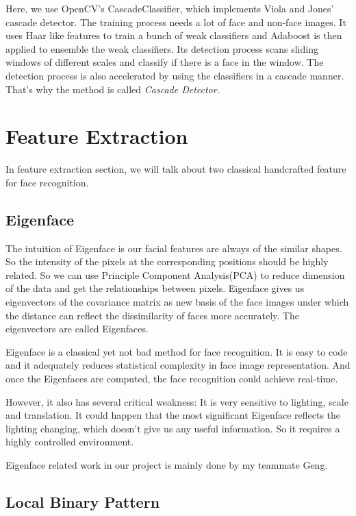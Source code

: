 \documentclass[paper=a4, fontsize=11pt]{scrartcl} %
\numberwithin{equation}{section} %
\numberwithin{figure}{section} %
\numberwithin{table}{section} %
\begin{document}
Here, we use OpenCV's CascadeClassifier, which implements Viola and Jones' cascade detector\cite{viola2001rapid}. The training process needs a lot of face and non-face images. It uses Haar like features to train a bunch of weak classifiers and Adaboost is then applied to ensemble the weak classifiers. Its detection process scans sliding windows of different scales and classify if there is a face in the window. The detection process is also accelerated by using the classifiers in a cascade manner. That's why the method is called \textit{Cascade Detector}.

\section{Feature Extraction}
In feature extraction section, we will talk about two classical handcrafted feature for face recognition.
\subsection{Eigenface}
The intuition of Eigenface\cite{turk1991face} is our facial features are always of the similar shapes. So the intensity of the pixels at the corresponding positions should be highly related. So we can use Principle Component Analysis(PCA) to reduce dimension of the data and get the relationships between pixels. Eigenface gives us eigenvectors of the covariance matrix as new basis of the face images under which the distance can reflect the dissimilarity of faces more accurately. The eigenvectors are called Eigenfaces.

Eigenface is a classical yet not bad method for face recognition. It is easy to code and it adequately reduces statistical complexity in face image representation. And once the Eigenfaces are computed, the face recognition could achieve real-time.

However, it also has several critical weakness: It is very sensitive to lighting, scale and translation. It could happen that the most significant Eigenface reflects the lighting changing, which doesn't give us any useful information. So it requires a highly controlled environment.

Eigenface related work in our project is mainly done by my teammate Geng.

\subsection{Local Binary Pattern}
\end{document}
